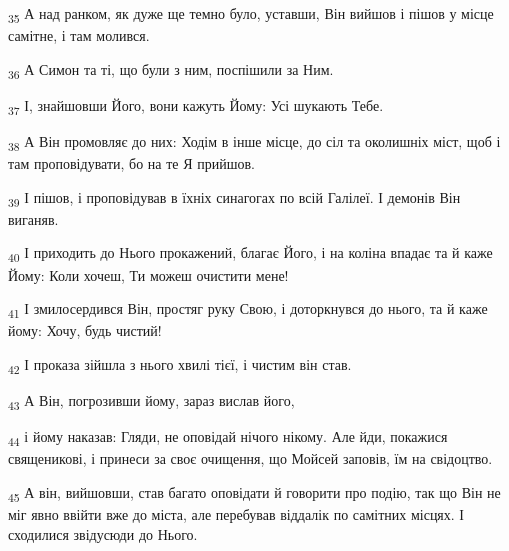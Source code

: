 \begin{tcolorbox}
\textsubscript{35} А над ранком, як дуже ще темно було, уставши, Він вийшов і пішов у місце самітне, і там молився.
\end{tcolorbox}
\begin{tcolorbox}
\textsubscript{36} А Симон та ті, що були з ним, поспішили за Ним.
\end{tcolorbox}
\begin{tcolorbox}
\textsubscript{37} І, знайшовши Його, вони кажуть Йому: Усі шукають Тебе.
\end{tcolorbox}
\begin{tcolorbox}
\textsubscript{38} А Він промовляє до них: Ходім в інше місце, до сіл та околишніх міст, щоб і там проповідувати, бо на те Я прийшов.
\end{tcolorbox}
\begin{tcolorbox}
\textsubscript{39} І пішов, і проповідував в їхніх синагогах по всій Галілеї. І демонів Він виганяв.
\end{tcolorbox}
\begin{tcolorbox}
\textsubscript{40} І приходить до Нього прокажений, благає Його, і на коліна впадає та й каже Йому: Коли хочеш, Ти можеш очистити мене!
\end{tcolorbox}
\begin{tcolorbox}
\textsubscript{41} І змилосердився Він, простяг руку Свою, і доторкнувся до нього, та й каже йому: Хочу, будь чистий!
\end{tcolorbox}
\begin{tcolorbox}
\textsubscript{42} І проказа зійшла з нього хвилі тієї, і чистим він став.
\end{tcolorbox}
\begin{tcolorbox}
\textsubscript{43} А Він, погрозивши йому, зараз вислав його,
\end{tcolorbox}
\begin{tcolorbox}
\textsubscript{44} і йому наказав: Гляди, не оповідай нічого нікому. Але йди, покажися священикові, і принеси за своє очищення, що Мойсей заповів, їм на свідоцтво.
\end{tcolorbox}
\begin{tcolorbox}
\textsubscript{45} А він, вийшовши, став багато оповідати й говорити про подію, так що Він не міг явно ввійти вже до міста, але перебував віддалік по самітних місцях. І сходилися звідусюди до Нього.
\end{tcolorbox}
